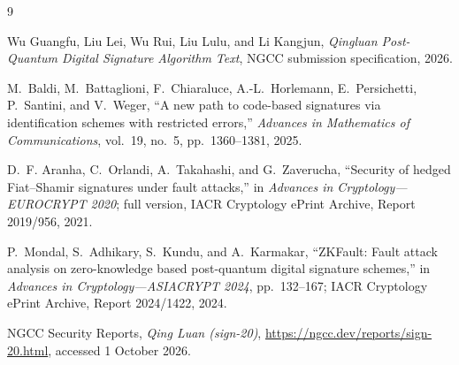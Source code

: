 \documentclass[11pt,a4paper]{article}
\begin{document}
\begin{thebibliography}{9}

Wu Guangfu, Liu Lei, Wu Rui, Liu Lulu, and Li Kangjun,
\newblock \emph{Qingluan Post-Quantum Digital Signature Algorithm Text},
\newblock NGCC submission specification, 2026.

M.~Baldi, M.~Battaglioni, F.~Chiaraluce, A.-L.~Horlemann,
E.~Persichetti, P.~Santini, and V.~Weger,
\newblock ``A new path to code-based signatures via identification schemes
with restricted errors,''
\newblock \emph{Advances in Mathematics of Communications}, vol.~19, no.~5,
pp.~1360--1381, 2025.

D.~F. Aranha, C.~Orlandi, A.~Takahashi, and G.~Zaverucha,
\newblock ``Security of hedged Fiat--Shamir signatures under fault attacks,''
\newblock in \emph{Advances in Cryptology---EUROCRYPT 2020}; full version,
IACR Cryptology ePrint Archive, Report 2019/956, 2021.

P.~Mondal, S.~Adhikary, S.~Kundu, and A.~Karmakar,
\newblock ``ZKFault: Fault attack analysis on zero-knowledge based
post-quantum digital signature schemes,''
\newblock in \emph{Advances in Cryptology---ASIACRYPT 2024}, pp.~132--167;
IACR Cryptology ePrint Archive, Report 2024/1422, 2024.

NGCC Security Reports,
\newblock \emph{Qing Luan (sign-20)},
\newblock \url{https://ngcc.dev/reports/sign-20.html}, accessed 1 October 2026.

\end{thebibliography}
\end{document}
